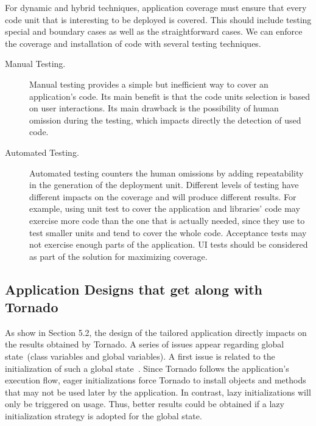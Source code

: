 
For dynamic and hybrid techniques, application coverage must ensure that every code unit that is interesting to be deployed is covered. This should include testing special and boundary cases as well as the straightforward cases. We can enforce the coverage and installation of code with several testing techniques.

\begin{description}
\item[Manual Testing.] Manual testing provides a simple but inefficient way to cover an application's code. Its main benefit is that the code units selection is based on user interactions. Its main drawback is the possibility of human omission during the testing, which impacts directly the detection of used code. 
\item[Automated Testing.] Automated testing counters the human omissions by adding repeatability in the generation of the deployment unit. Different levels of testing have different impacts on the coverage and will produce different results. For example, using unit test to cover the application and libraries' code may exercise more code than the one that is actually needed, since they use to test smaller units and tend to cover the whole code. Acceptance tests may not exercise enough parts of the application. UI tests should be considered as part of the solution for maximizing coverage.
\end{description}


\subsection{Application Designs that get along with Tornado} As show in Section 5.2, the design of the tailored application directly impacts on the results obtained by Tornado. A series of issues appear regarding global state~(\eg class variables and global variables). A first issue is related to the initialization of such a global state~\cite{Unga95a}. Since Tornado follows the application's execution flow, eager initializations force Tornado to install objects and methods that may not be used later by the application. In contrast, lazy initializations will only be triggered on usage. Thus, better results could be obtained if a lazy initialization strategy is adopted for the global state.

